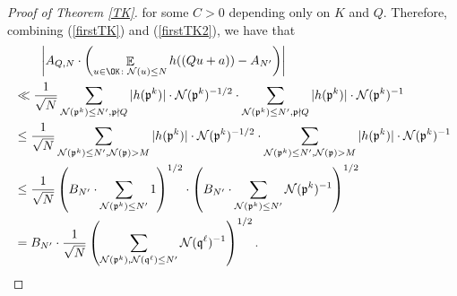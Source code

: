 \documentclass[11pt]{amsart}
\theoremstyle{definition}
\DeclareMathOperator*{\E}{\mathbb{E}}
\newcommand{\NN}{{\mathcal N}}
\newcommand{\mf}{\mathfrak}
\newcommand{\FM}[1]{{\color{violet}{{#1}}}}
\begin{document}
\begin{proof}[Proof of Theorem \ref{TK}]
for some $C>0$ depending only on $K$ and $Q$. Therefore,
combining (\ref{firstTK}) and (\ref{firstTK2}), we have that
\begin{equation}\label{firstTK0}
    \begin{split}
       &\qquad \left| A_{Q,N}\cdot\left(\E_{u\in\OK\colon\NN(u) \leq N}h((Qu+a))-A_{N'}\right)\right|
       \\&\ll \frac{1}{\sqrt{N}}\sum_{\NN(\mf p^{k})\leq N', \mf p\nmid Q}\vert h(\mf p^{k})\vert \cdot \NN(\mf p^{k})^{-1/2}\cdot \sum_{\NN(\mf p^{k})\leq N', \mf p\nmid Q}\vert h(\mf p^{k})\vert\cdot \NN(\mf p^{k})^{-1}
        \\&\leq \frac{1}{\sqrt{N}}\sum_{\NN(\mf p^{k})\leq N', \NN(\mf p)>M}\vert h(\mf p^{k})\vert\cdot \NN(\mf p^{k})^{-1/2}\cdot \sum_{\NN(\mf p^{k})\leq N', \NN(\mf p)>M}\vert h(\mf p^{k})\vert\cdot \NN(\mf p^{k})^{-1}
          \\&\leq \frac{1}{\sqrt{N}}\left(B_{N'}\cdot\sum_{\NN(\mf p^{k})\leq N'} 1\right)^{1/2}\cdot\left(B_{N'}\cdot\sum_{\NN(\mf p^{k})\leq N'}\NN(\mf p^{k})^{-1}\right)^{1/2}
          \\&=B_{N'}\cdot \frac{1}{\sqrt{N}}\left(\sum_{\NN(\mf p^{k}),\NN(\mf q^{\ell})\leq N'}\NN(\mf q^{\ell})^{-1}\right)^{1/2}.
          \end{split}
\end{equation}





\end{proof}
\end{document}
